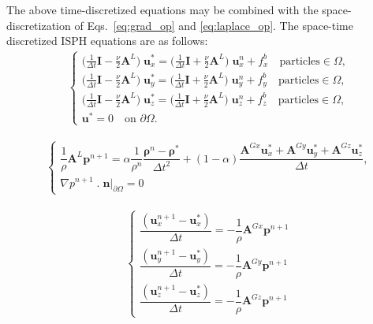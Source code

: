 The above time-discretized equations may be combined with the space-discretization of Eqs.~\ref{eq:grad_op} and \ref{eq:laplace_op}. The space-time discretized ISPH equations are as follows:
\begin{align}
&\begin{cases}\label{eq:predict_disc} 
\Big(\frac{1}{\Delta t} \mathbf{I}-\frac{\nu}{2} \mathbf{A}^L\Big)\; \mathbf{u}^*_x=
\Big(\frac{1}{\Delta t} \mathbf{I}+\frac{\nu}{2} \mathbf{A}^L\Big) \; \mathbf{u}^n_x+ {f}^b_x \quad \text{particles}\in \Omega,\\
\Big(\frac{1}{\Delta t} \mathbf{I}-\frac{\nu}{2} \mathbf{A}^L\Big)\; \mathbf{u}^*_y=
\Big(\frac{1}{\Delta t} \mathbf{I}+\frac{\nu}{2} \mathbf{A}^L\Big) \; \mathbf{u}^n_y+ {f}^b_y \quad \text{particles}\in \Omega,\\
\Big(\frac{1}{\Delta t} \mathbf{I}-\frac{\nu}{2} \mathbf{A}^L\Big)\; \mathbf{u}^*_z=
\Big(\frac{1}{\Delta t} \mathbf{I}+\frac{\nu}{2} \mathbf{A}^L\Big) \; \mathbf{u}^n_z+ {f}^b_z \quad \text{particles} \in \Omega,\\
\mathbf{u}^*=0 \quad \text{on } \partial\Omega.
\end{cases}
\end{align}

\begin{align}
&\begin{cases}\label{eq:press_disc} 
\dfrac{1}{\rho} \mathbf{A}^L \mathbf{p}^{n+1}=\alpha\dfrac{1}{\rho^n}\dfrac{\mathbf{\rho}^n-\mathbf{\rho}^*}{\Delta t^2} + (1-\alpha) \dfrac{\mathbf{A}^{Gx} \mathbf{u}_x^*+\mathbf{A}^{Gy} \mathbf{u}_y^*+\mathbf{A}^{Gz}\mathbf{u}_z^*}{\Delta t},\\
\nabla p^{n+1}\;.\;\mathbf{n}|_{\partial \Omega}=0
\end{cases}
\end{align}

\begin{align}
&\begin{cases}\label{eq:correct_disc} 
\dfrac{(\mathbf{u}_x^{n+1}-\mathbf{u}_x^*)}{\Delta t}=-\dfrac{1}{\rho} \mathbf{A}^{Gx} \mathbf{p}^{n+1} \\
\dfrac{(\mathbf{u}_y^{n+1}-\mathbf{u}_y^*)}{\Delta t}=-\dfrac{1}{\rho} \mathbf{A}^{Gy} \mathbf{p}^{n+1}\\
\dfrac{(\mathbf{u}_z^{n+1}-\mathbf{u}_z^*)}{\Delta t}=-\dfrac{1}{\rho} \mathbf{A}^{Gz} \mathbf{p}^{n+1}
\end{cases}
\end{align}

